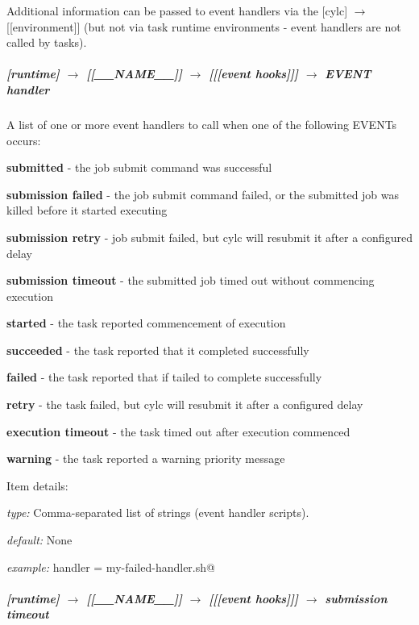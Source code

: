 Additional information can be passed to event handlers via the
[cylc] $\rightarrow$ [[environment]] (but not via task
runtime environments - event handlers are not called by tasks).

\subparagraph[EVENT handler]{[runtime] $\rightarrow$ [[\_\_NAME\_\_]] $\rightarrow$ [[[event hooks]]] $\rightarrow$ EVENT handler}

A list of one or more event handlers to call when one of the following EVENTs occurs:
\begin{myitemize}
    \item {\bf submitted}      - the job submit command was successful
    \item {\bf submission failed}  - the job submit command failed, or the
                                   submitted job was killed before it started executing
    \item {\bf submission retry}   - job submit failed, but cylc will resubmit it
                                   after a configured delay
    \item {\bf submission timeout} - the submitted job timed out without commencing execution

    \item {\bf started}        - the task reported commencement of execution
    \item {\bf succeeded}      - the task reported that it completed successfully
    \item {\bf failed}         - the task reported that if tailed to complete successfully
    \item {\bf retry}          - the task failed, but cylc will resubmit it
                                  after a configured delay
    \item {\bf execution timeout}        - the task timed out after execution commenced
    \item {\bf warning}        - the task reported a warning priority message
\end{myitemize}

Item details:
\begin{myitemize}
    \item {\em type:} Comma-separated list of strings (event handler scripts).
    \item {\em default:} None
    \item {\em example:} \lstinline@failed handler = my-failed-handler.sh@
\end{myitemize}

\subparagraph[submission timeout]{[runtime] $\rightarrow$ [[\_\_NAME\_\_]] $\rightarrow$ [[[event hooks]]] $\rightarrow$ submission timeout}

